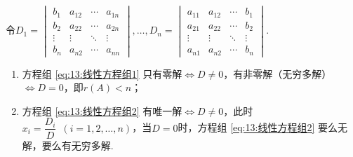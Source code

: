 \begin{theorem}[Cramer法则]
    令$D_1=\begin{vmatrix}
            b_1    & a_{12} & \cdots & a_{1n} \\
            b_2    & a_{22} & \cdots & a_{2n} \\
            \vdots & \vdots & \ddots & \vdots \\
            b_n    & a_{n2} & \cdots & a_{nn}
        \end{vmatrix},\ldots,D_n=\begin{vmatrix}
            a_{11} & a_{12} & \cdots & b_1    \\
            a_{21} & a_{22} & \cdots & b_2    \\
            \vdots & \vdots & \ddots & \vdots \\
            a_{n1} & a_{n2} & \cdots & b_n
        \end{vmatrix}$.

    \begin{enumerate}
        \item 方程组 \ref{eq:13:线性方程组1} 只有零解$\iff D \neq 0$，有非零解（无穷多解）$\iff D=0$，即$r(A)<n$；

        \item 方程组 \ref{eq:13:线性方程组2} 有唯一解$\iff D \neq 0$，此时$x_i=\dfrac{D_i}{D}\enspace(i=1,2,\ldots,n)$，当$D=0$时，方程组 \ref{eq:13:线性方程组2} 要么无解，要么有无穷多解.
    \end{enumerate}
\end{theorem}

